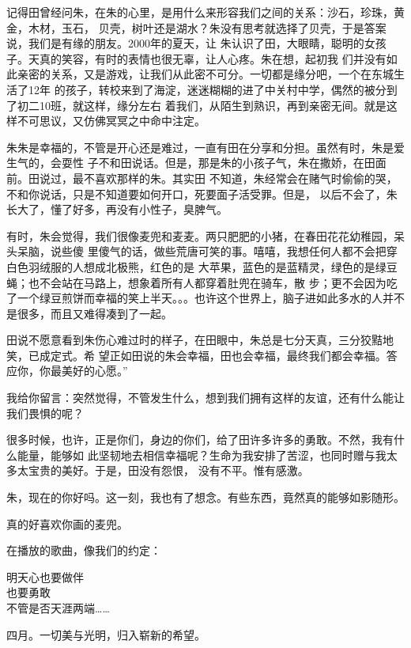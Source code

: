 		记得田曾经问朱，在朱的心里，是用什么来形容我们之间的关系：沙石，珍珠，黄金，木材，玉石，
	贝壳，树叶还是湖水？朱没有思考就选择了贝壳，于是答案说，我们是有缘的朋友。2000年的夏天，让
	朱认识了田，大眼睛，聪明的女孩子。天真的笑容，有时的表情也很无辜，让人心疼。朱在想，起初我
	们并没有如此亲密的关系，又是游戏，让我们从此密不可分。一切都是缘分吧，一个在东城生活了12年
	的孩子，转校来到了海淀，迷迷糊糊的进了中关村中学，偶然的被分到了初二10班，就这样，缘分左右
	着我们，从陌生到熟识，再到亲密无间。就是这样不可思议，又仿佛冥冥之中命中注定。

		朱朱是幸福的，不管是开心还是难过，一直有田在分享和分担。虽然有时，朱是爱生气的，会耍性
	子不和田说话。但是，那是朱的小孩子气，朱在撒娇，在田面前。田说过，最不喜欢那样的朱。其实田
	不知道，朱经常会在赌气时偷偷的哭，不和你说话，只是不知道要如何开口，死要面子活受罪。但是，
	以后不会了，朱长大了，懂了好多，再没有小性子，臭脾气。

		有时，朱会觉得，我们很像麦兜和麦麦。两只肥肥的小猪，在春田花花幼稚园，呆头呆脑，说些傻
	里傻气的话，做些荒唐可笑的事。嘻嘻，我想任何人都不会把穿白色羽绒服的人想成北极熊，红色的是
	大苹果，蓝色的是蓝精灵，绿色的是绿豆蝇；也不会站在马路上，想象着所有人都穿着肚兜在骑车，散
	步；更不会因为吃了一个绿豆煎饼而幸福的笑上半天。。。也许这个世界上，脑子进如此多水的人并不
	是很多，而且又难得凑到了一起。

		田说不愿意看到朱伤心难过时的样子，在田眼中，朱总是七分天真，三分狡黠地笑，已成定式。希
	望正如田说的朱会幸福，田也会幸福，最终我们都会幸福。答应你，你最美好的心愿。”

		我给你留言：突然觉得，不管发生什么，想到我们拥有这样的友谊，还有什么能让我们畏惧的呢？

		很多时候，也许，正是你们，身边的你们，给了田许多许多的勇敢。不然，我有什么能量，能够如
	此坚韧地去相信幸福呢？生命为我安排了苦涩，也同时赠与我太多太宝贵的美好。于是，田没有怨恨，
	没有不平。惟有感激。

		朱，现在的你好吗。这一刻，我也有了想念。有些东西，竟然真的能够如影随形。

		真的好喜欢你画的麦兜。

		在播放的歌曲，像我们的约定：

		\longpoem{}{}{}
			明天心也要做伴 \\
			也要勇敢 \\
			不管是否天涯两端……
		\endlongpoem

	\endwriting



		四月。一切美与光明，归入崭新的希望。

